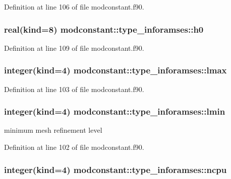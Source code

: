 Definition at line 106 of file modconstant.\-f90.

\hypertarget{structmodconstant_1_1type__inforamses_a6ceaf1c28dc83b577f72b41e26d988e4}{
\subsubsection[{h0}]{\setlength{\rightskip}{0pt plus 5cm}real(kind=8) modconstant\-::type\-\_\-inforamses\-::h0}}\label{structmodconstant_1_1type__inforamses_a6ceaf1c28dc83b577f72b41e26d988e4}


Definition at line 109 of file modconstant.\-f90.

\hypertarget{structmodconstant_1_1type__inforamses_ae350ee72500331c8acabc2ebcfce2bd4}{
\subsubsection[{lmax}]{\setlength{\rightskip}{0pt plus 5cm}integer(kind=4) modconstant\-::type\-\_\-inforamses\-::lmax}}\label{structmodconstant_1_1type__inforamses_ae350ee72500331c8acabc2ebcfce2bd4}


Definition at line 103 of file modconstant.\-f90.

\hypertarget{structmodconstant_1_1type__inforamses_a05881a6c4f31c578ce604dd4f0ba746a}{
\subsubsection[{lmin}]{\setlength{\rightskip}{0pt plus 5cm}integer(kind=4) modconstant\-::type\-\_\-inforamses\-::lmin}}\label{structmodconstant_1_1type__inforamses_a05881a6c4f31c578ce604dd4f0ba746a}


minimum mesh refinement level 



Definition at line 102 of file modconstant.\-f90.

\hypertarget{structmodconstant_1_1type__inforamses_a7267e8123e67211ef5ce2c51c1974148}{
\subsubsection[{ncpu}]{\setlength{\rightskip}{0pt plus 5cm}integer(kind=4) modconstant\-::type\-\_\-inforamses\-::ncpu}}\label{structmodconstant_1_1type__inforamses_a7267e8123e67211ef5ce2c51c1974148}


